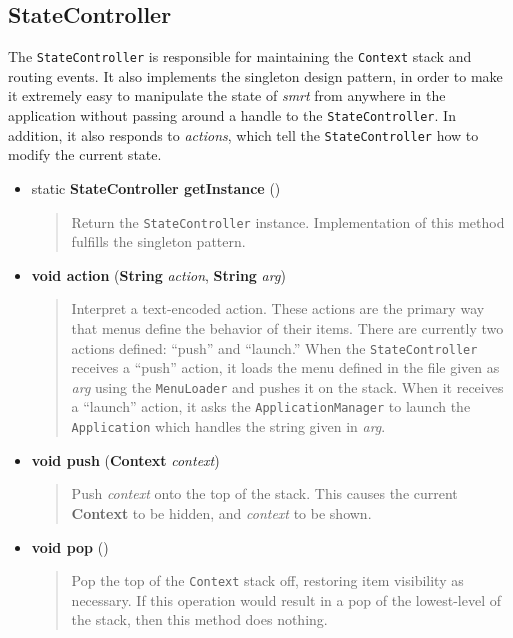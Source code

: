 \documentclass[letterpaper, titlepage, 11pt]{article}
\begin{document}
\subsection{StateController}
The \texttt{StateController} is responsible for maintaining the \texttt{Context}
stack and routing events.  It also implements the singleton design pattern, in
order to make it extremely easy to manipulate the state of \textit{smrt} from
anywhere in the application without passing around a handle to the
\texttt{StateController}.  In addition, it also responds to \textit{actions},
which tell the \texttt{StateController} how to modify the current state.

\begin{itemize}
\item[] static \textbf{StateController getInstance} ()
\begin{quotation}
Return the \texttt{StateController} instance.  Implementation of this method
fulfills the singleton pattern.
\end{quotation}

\item[] \textbf{void action} (\textbf{String} \textit{action}, \textbf{String} \textit{arg})
\begin{quotation}
Interpret a text-encoded action.  These actions are the primary way that menus
define the behavior of their items.  There are currently two actions defined:
``push'' and ``launch.''  When the \texttt{StateController} receives a ``push''
action, it loads the menu defined in the file given as \textit{arg} using the
\texttt{MenuLoader} and pushes it on the stack.  When it receives a ``launch''
action, it asks the \texttt{ApplicationManager} to launch the
\texttt{Application} which handles the string given in \textit{arg}.
\end{quotation}

\item[] \textbf{void push} (\textbf{Context} \textit{context})
\begin{quotation}
Push \textit{context} onto the top of the stack.  This causes the current
\textbf{Context} to be hidden, and \textit{context} to be shown.
\end{quotation}

\item[] \textbf{void pop} ()
\begin{quotation}
Pop the top of the \texttt{Context} stack off, restoring item visibility as
necessary.  If this operation would result in a pop of the lowest-level of the
stack, then this method does nothing.
\end{quotation}


\end{itemize}
\end{document}
